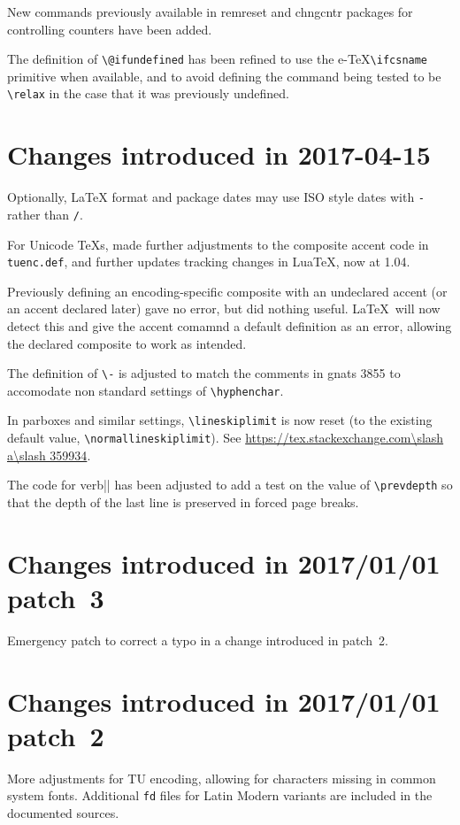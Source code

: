 \documentclass{ltxguide}
\newcommand\Lpack[1]{\mbox{\textsf{#1}}}
\newcommand\gnatsissue[1]{gnats #1}
\newcommand\sxanswer[1]{\url{https://tex.stackexchange.com\slash a\slash #1}}
\newcommand\gnatsissue[1]{%
    \href{https://www.latex-project.org/cgi-bin/ltxbugs2html?pr=latex/#1}{gnats #1}}
\newcommand\sxanswer[1]{%
     \url{https://tex.stackexchange.com/a/#1}}
\begin{document}
New commands previously available in \Lpack{remreset} and
\Lpack{chngcntr} packages for controlling counters have been added.

The definition of \verb|\@ifundefined| has been refined to use the e-\TeX \verb|\ifcsname|
primitive when available, and to avoid defining the command being tested to be \verb|\relax|
in the case that it was previously undefined.

\section{Changes  introduced in 2017-04-15}
Optionally, \LaTeX{} format and package dates may use ISO style dates with
\texttt{-}  rather than \texttt{/}.

For Unicode \TeX{}s, made further adjustments to the composite accent
code in \texttt{tuenc.def}, and further updates tracking changes in
Lua\TeX, now at 1.04.

Previously defining an encoding-specific composite with an undeclared
accent (or an accent declared later) gave no error, but did nothing useful.
\LaTeX\ will now detect this and give the accent comamnd a default definition
as an error, allowing the declared composite to work as intended.

The definition of \verb|\-| is adjusted to match the comments in
\gnatsissue{3855} to accomodate non standard settings of \verb|\hyphenchar|.

In parboxes and similar settings, \verb|\lineskiplimit| is now
reset (to the existing default value, \verb|\normallineskiplimit|).
See \sxanswer{359934}.

 The code for verb|\newpage| has been adjusted to add a test on the value of
\verb|\prevdepth| so that the depth of the last line is preserved in
forced page breaks.

\section{Changes  introduced in 2017/01/01 patch~3}
Emergency patch to correct a typo in a change introduced in patch~2.

\section{Changes  introduced in 2017/01/01 patch~2}
More adjustments for TU encoding, allowing for characters missing in
common system fonts. Additional \texttt{fd} files
for Latin Modern variants are included in the documented sources.
\end{document}

